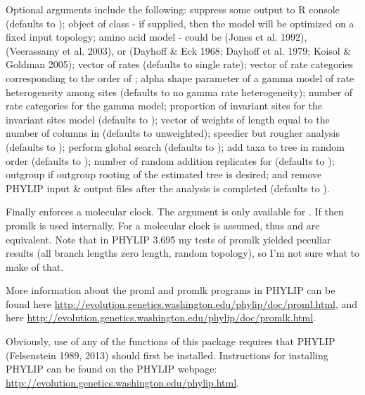 \documentclass[a4paper]{book}
\begin{document}
%
\begin{Details}\relax
Optional arguments include the following:  suppress some output to R console (defaults to );  object of class  - if supplied, then the model will be optimized on a fixed input topology;  amino acid model - could be  (Jones et al. 1992),  (Veerassamy et al. 2003), or  (Dayhoff \& Eck 1968; Dayhoff et al. 1979; Koisol \& Goldman 2005);  vector of rates (defaults to single rate);  vector of rate categories corresponding to the order of ;  alpha shape parameter of a gamma model of rate heterogeneity among sites (defaults to no gamma rate heterogeneity);  number of rate categories for the gamma model;  proportion of invariant sites for the invariant sites model (defaults to );  vector of weights of length equal to the number of columns in  (defaults to unweighted);  speedier but rougher analysis (defaults to );  perform global search (defaults to );  add taxa to tree in random order (defaults to );  number of random addition replicates for  (defaults to );  outgroup if outgroup rooting of the estimated tree is desired; and  remove PHYLIP input \& output files after the analysis is completed (defaults to ).

Finally  enforces a molecular clock. The argument  is only available for . If  then promlk is used internally. For  a molecular clock is assumed, thus  and  are equivalent. Note that in PHYLIP 3.695 my tests of promlk yielded peculiar results (all branch lengths zero length, random topology), so I'm not sure what to make of that.

More information about the proml and promlk programs in PHYLIP can be found here \url{http://evolution.genetics.washington.edu/phylip/doc/proml.html}, and here \url{http://evolution.genetics.washington.edu/phylip/doc/promlk.html}.

Obviously, use of any of the functions of this package requires that PHYLIP (Felsenstein 1989, 2013) should first be installed. Instructions for installing PHYLIP can be found on the PHYLIP webpage: \url{http://evolution.genetics.washington.edu/phylip.html}.
\end{Details}
\end{document}
